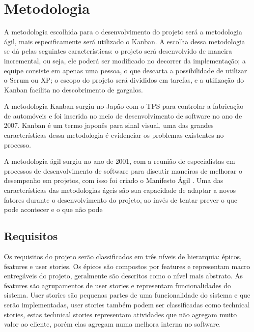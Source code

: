 \chapter[Metodologia]{Metodologia}
A metodologia escolhida para o desenvolvimento do projeto será a metodologia ágil, mais especificamente será utilizado o Kanban. A escolha dessa metodologia se dá pelas seguintes características: o projeto será desenvolvido de maneira incremental, ou seja, ele poderá ser modificado no decorrer da implementação; a equipe consiste em apenas uma pessoa, o que descarta a possibilidade de utilizar o Scrum ou XP; o escopo do projeto será divididos em tarefas, e a utilização do Kanban facilita no descobrimento de gargalos.

A metodologia Kanban surgiu no Japão com o TPS \cite{tps} para controlar a fabricação de automóveis e foi inserida no meio de desenvolvimento de software no ano de 2007. Kanban é um termo japonês para sinal visual, uma das grandes características dessa metodologia é evidenciar os problemas existentes no processo. 

A metodologia ágil surgiu no ano de 2001, com a reunião de especialistas em processos de desenvolvimento de software para discutir maneiras de melhorar o desempenho em projetos, com isso foi criado o Manifesto Ágil \cite{agil}. Uma das características das metodologias ágeis são sua capacidade de adaptar a novos fatores durante o desenvolvimento do projeto, ao invés de tentar prever o que pode acontecer e o que não pode
\section{Requisitos}
Os requisitos do projeto serão classificados em três níveis de hierarquia:  épicos, features e user stories. Os épicos são compostos por features e representam macro entregáveis do projeto, geralmente são descritos como o nível mais abstrato. As features são agrupamentos de user stories e representam funcionalidades do sistema. User stories são pequenas partes de uma funcionalidade do sistema e que serão implementadas, user stories também podem ser classificadas como technical stories, estas technical stories representam atividades que não agregam muito valor ao cliente, porém elas agregam numa melhora interna no software.

